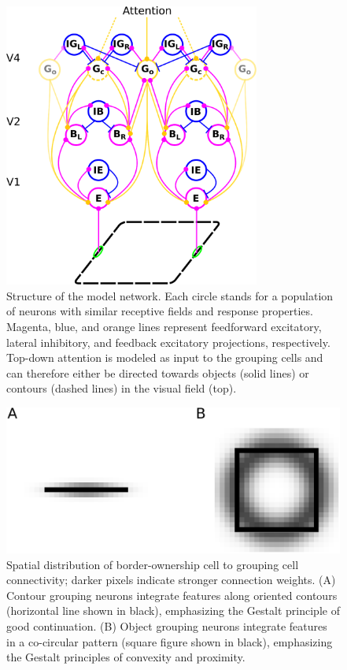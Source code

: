 \begin{figure}[t!]
\centering
\includegraphics[width=0.75\textwidth]{Contour/figs/Fig1.eps}
\makeatletter
\let\@currsize\normalsize
\caption[Structure of the grouping model network]{Structure of the model network. Each circle stands for a population of neurons with similar receptive fields and response properties. Magenta, blue, and orange lines represent feedforward excitatory, lateral inhibitory, and feedback excitatory projections, respectively. Top-down attention is modeled as input to the grouping cells and can therefore either be directed towards objects (solid lines) or contours (dashed lines) in the visual field (top).}
\label{Fig:anatomy}
\end{figure}

\begin{figure}[t]
\centering
\includegraphics[width=\textwidth]{Contour/figs/Fig2.eps}
\makeatletter
\let\@currsize\normalsize
\caption[Contour and object grouping cell receptive fields]{Spatial distribution of border-ownership cell to grouping cell connectivity; darker pixels indicate stronger connection weights. (A) Contour grouping neurons integrate features along oriented contours (horizontal line shown in black), emphasizing the Gestalt principle of good continuation. (B) Object grouping neurons integrate features in a co-circular pattern (square figure shown in black), emphasizing the Gestalt principles of convexity and proximity.} 
\label{Fig:BG_projections}
\end{figure}

